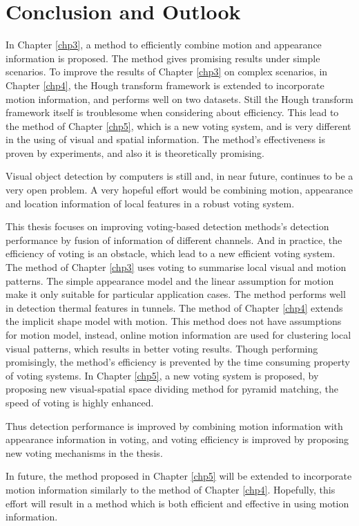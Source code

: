 \chapter{Conclusion and Outlook}
\label{chp6}

In Chapter \ref{chp3}, a method to efficiently combine motion and appearance information is proposed. The method gives promising results under simple scenarios. To improve the results of Chapter \ref{chp3} on complex scenarios, in Chapter \ref{chp4}, the Hough transform framework is extended to incorporate motion information, and performs well on two datasets. Still the Hough transform framework itself is troublesome when considering about efficiency. This lead to the method of Chapter \ref{chp5}, which is a new voting system, and is very different in the using of visual and spatial information. The method's effectiveness is proven by experiments, and also it is theoretically promising.

Visual object detection by computers is still and, in near future, continues to be a very open problem. A very hopeful effort would be combining motion, appearance and location information of local features in a robust voting system.

This thesis focuses on improving voting-based detection methods's detection performance by fusion of information of different channels. And in practice, the efficiency of voting is an obstacle, which lead to a new efficient voting system. The method of Chapter \ref{chp3} uses voting to summarise local visual and motion patterns. The simple appearance model and the linear assumption for motion make it only suitable for particular application cases. The method performs well in detection thermal features in tunnels. The method of Chapter \ref{chp4} extends the implicit shape model with motion. This method does not have assumptions for motion model, instead, online motion information are used for clustering local visual patterns, which results in better voting results. Though performing promisingly, the method's efficiency is prevented by the time consuming property of voting systems. In Chapter \ref{chp5}, a new voting system is proposed, by proposing new visual-spatial space dividing method for pyramid matching, the speed of voting is highly enhanced.

Thus detection performance is improved by combining motion information with appearance information in voting, and voting efficiency is improved by proposing new voting mechanisms in the thesis.

In future, the method proposed in Chapter \ref{chp5} will be extended to incorporate motion information similarly to the method of Chapter \ref{chp4}. Hopefully, this effort will result in a method which is both efficient and effective in using motion information.
